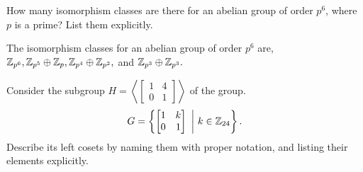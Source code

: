\documentclass[titlepage]{article}
\begin{document}
\begin{problem}{2}
How many isomorphism classes are there for an abelian group of order $p^6$, where $p$ is a prime? List them explicitly.
\end{problem}
\begin{solution}
The isomorphism classes for an abelian group of order $p^6$ are, $\mathbb{Z}_{p^6}, \mathbb{Z}_{p^5}\oplus\mathbb{Z}_p, \mathbb{Z}_{p^4}\oplus \mathbb{Z}_{p^2},$ and $\mathbb{Z}_{p^3} \oplus \mathbb{Z}_{p^3}.$
\end{solution}
\begin{problem}{3}
Consider the subgroup $H = \left\langle \begin{bmatrix}1&4\\0&1 \end{bmatrix}\right\rangle$ of the group.
$$G = \left\{ \begin{bmatrix}1&k \\ 0&1\end{bmatrix} \ \bigg| \ k \in \mathbb{Z}_{24}\right\}.$$
Describe its left cosets by naming them with proper notation, and listing their elements explicitly.
\end{problem}
\end{document}
